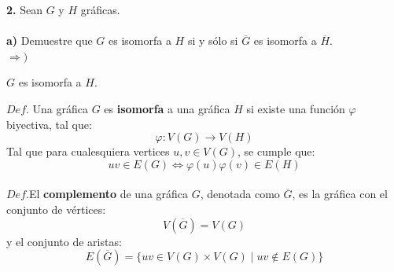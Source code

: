 \documentclass[12pt]{article}
\begin{document}
\textbf{2.} Sean $G$ y $H$ gráficas.
\\
\\
\textbf{a)} Demuestre que $G$ es isomorfa a $H$ si y sólo si $\overline{G}$ es isomorfa a $\overline{H}$.\\
$\Rightarrow)$
\begin{tcolorbox}[title=\textbf{Hipotesis}, colback=red!15!white, colframe=black!, breakable]
    $G$ es isomorfa a $H$.
\end{tcolorbox}
\begin{tcolorbox}[title=\textbf{Definiciones}, colback=blue!15!white, colframe=black!, breakable]
    $Def$. Una gráfica $G$ es \textbf{isomorfa} a una gráfica $H$ si existe una función $\varphi$ biyectiva, tal que:
    \[\varphi: V(G) \rightarrow V(H)\]
    Tal que para cualesquiera vertices $u,v \in V(G)$, se cumple que:
    \[uv \in E(G) \Leftrightarrow \varphi(u)\varphi(v) \in E(H)\]
    \\
    $Def$.El \textbf{complemento} de una gráfica $G$, denotada como $\overline{G}$, es la gráfica con el conjunto de vértices:
    \[V(\overline{G}) = V(G)\]
    y el conjunto de aristas:
    \[E(\overline{G}) = \{ uv \in V(G) \times V(G) \mid uv \notin E(G)\}\]
\end{tcolorbox}
\end{document}
